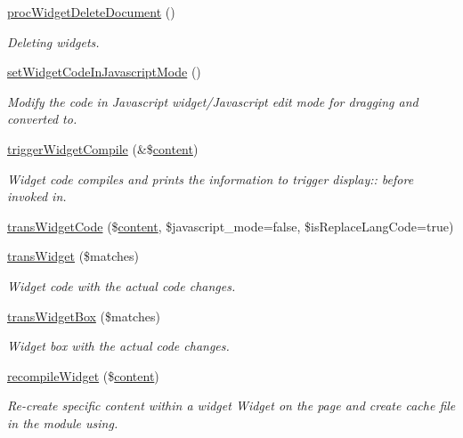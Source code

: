 \begin{DoxyCompactItemize}
\hyperlink{classwidgetController_a9223bf4586acbe9f3262cde3cff193a7}{proc\+Widget\+Delete\+Document} ()
\begin{DoxyCompactList}\small\item\em Deleting widgets. \end{DoxyCompactList}\item 
\hyperlink{classwidgetController_a528aa6c73d47f9149cfe88528d28b5c7}{set\+Widget\+Code\+In\+Javascript\+Mode} ()
\begin{DoxyCompactList}\small\item\em Modify the code in Javascript widget/\+Javascript edit mode for dragging and converted to. \end{DoxyCompactList}\item 
\hyperlink{classwidgetController_acb8488ae3081bdfcf77dbd73740174be}{trigger\+Widget\+Compile} (\&\$\hyperlink{classcontent}{content})
\begin{DoxyCompactList}\small\item\em Widget code compiles and prints the information to trigger display\+:\+: before invoked in. \end{DoxyCompactList}\item 
\hyperlink{classwidgetController_a948e4ce023dc430a42607019bab5d878}{trans\+Widget\+Code} (\$\hyperlink{classcontent}{content}, \$javascript\+\_\+mode=false, \$is\+Replace\+Lang\+Code=true)
\item 
\hyperlink{classwidgetController_ab83211452280836e73df5f7b6acdea82}{trans\+Widget} (\$matches)
\begin{DoxyCompactList}\small\item\em Widget code with the actual code changes. \end{DoxyCompactList}\item 
\hyperlink{classwidgetController_ad406bf4681c3dc1ccf37897479218111}{trans\+Widget\+Box} (\$matches)
\begin{DoxyCompactList}\small\item\em Widget box with the actual code changes. \end{DoxyCompactList}\item 
\hyperlink{classwidgetController_a0f43ca1a0a8bff6d4fe8d8aca50d65e1}{recompile\+Widget} (\$\hyperlink{classcontent}{content})
\begin{DoxyCompactList}\small\item\em Re-\/create specific content within a widget Widget on the page and create cache file in the module using. \end{DoxyCompactList}\item 

\end{DoxyCompactItemize}
